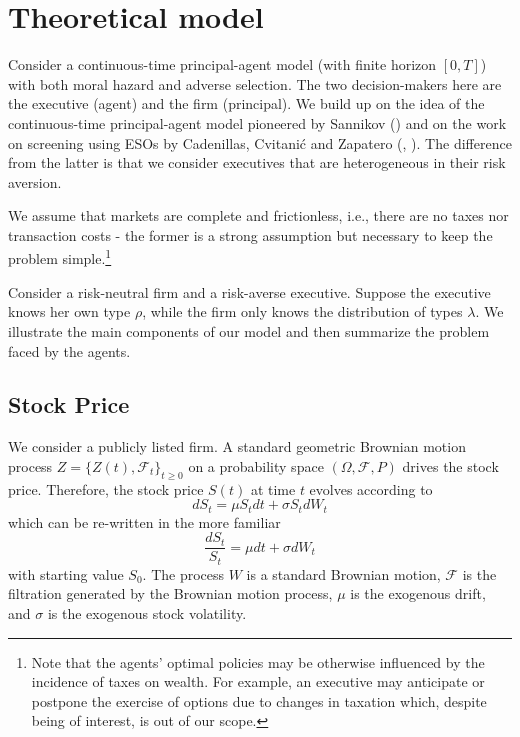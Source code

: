\section{Theoretical model}

Consider a continuous-time principal-agent model (with finite horizon $[0, T]$) with both moral hazard and adverse selection. The two decision-makers here are the executive (agent) and the firm (principal).
We build up on the idea of the continuous-time principal-agent model pioneered by Sannikov (\cite{sannikov2008continuous}) and on the work on screening using ESOs by Cadenillas, Cvitanić and Zapatero (\cite{cadenillas2002executive}, \cite{cadenillas2005executive}). The difference from the latter is that we consider executives that are heterogeneous in their risk aversion.

We assume that markets are complete and frictionless, i.e., there are no taxes nor transaction costs - the former is a strong assumption but necessary to keep the problem simple.\footnote{Note that the agents' optimal policies may be otherwise influenced by the incidence of taxes on wealth. For example, an executive may anticipate or postpone the exercise of options due to changes in taxation which, despite being of interest, is out of our scope.}

Consider a risk-neutral firm and a risk-averse executive. Suppose the executive knows her own type $\rho$, while the firm only knows the distribution of types $\lambda$. We illustrate the main components of our model and then summarize the problem faced by the agents.


\subsection{Stock Price}
We consider a publicly listed firm. A standard geometric Brownian motion process $Z = \{ Z(t), \mathscr{F}_t \}_{t \ge 0}$ on a probability space $(\Omega, \mathscr{F}, P)$ drives the stock price. 
Therefore, the stock price $S(t)$ at time $t$ evolves according to 
$$ dS_t = \mu S_t dt + \sigma S_t dW_t $$
which can be re-written in the more familiar
$$ \frac{dS_t}{S_t} = \mu dt + \sigma dW_t $$
with starting value $S_0$. The process $W$ is a standard Brownian motion, $\mathscr{F}$ is the filtration generated by the Brownian motion process, $\mu$ is the exogenous drift, and $\sigma$ is the exogenous stock volatility. 


